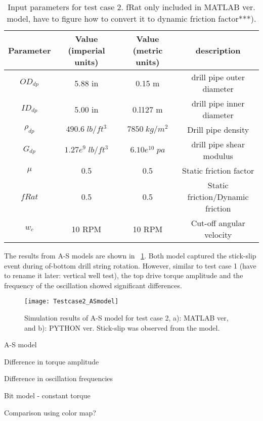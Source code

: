  \begin{table}[!hbt]
\centering
\begin{tabular}{|c|c|c|c|}
\hline
Parameter & Value (imperial units) & Value (metric units) & description\\                                                              
\hline
$OD_{dp}$ & 5.88 in & 0.15 m & drill pipe outer diameter\\                                                       
\hline
$ID_{dp}$ & 5.00 in & 0.l127 m & drill pipe inner diameter  \\                                                      
\hline
$\rho_{dp}$ & $490.6\;lb/ft^3$ & $7850\;kg/m^2$ & Drill pipe density \\                                                  
\hline
$G_{dp}$ & $1.27e^{9}\;lb/ft^3$ & $6.10e^{10}\;pa$ & drill pipe shear modulus\\                                                              
\hline
$\mu$ & 0.5 & 0.5 & Static friction factor\\
\hline
$fRat$ & 0.5 & 0.5 & Static friction/Dynamic friction\\
\hline
$w_c$ & 10 RPM & 10 RPM & Cut-off angular velocity\\
\hline
\end{tabular}
\caption[Input parameters for test case 2.]{Input parameters for test case 2. fRat only included in MATLAB ver. model, have to figure how to convert it to dynamic friction factor***).}\label{table_Inclinedwell_input}
\end{table}

The results from A-S models are shown in \figurename~\ref{figure_testcase2_ASmodel}. Both model captured the stick-slip event during of-bottom drill string rotation. However, similar to test case 1 (have to rename it later: vertical well test), the top drive torque amplitude and the frequency of the oscillation showed significant differences.
 
\begin{figure}[!hbt]
  \centering
  \texttt{[image: Testcase2\_ASmodel]}
  \caption[Result from A-S model. (test case 2)]{Simulation results of A-S model for test case 2, a): MATLAB ver, and b): PYTHON ver. Stick-slip was observed from the model.}\label{figure_testcase2_ASmodel}
\end{figure}

A-S model
\begin{numberedlist}
	\item Difference in torque amplitude
	\item Difference in oscillation frequencies
	\item Bit model - constant torque
	\item Comparison using color map?
\end{numberedlist}
